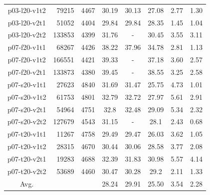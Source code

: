 \begin{table}[!h]
\begin {tabular}[!h]{|c|r|c|c|c|c|c|c|}
p03-l20-v1t2    & 79215 & 4467  & 30.19 & 30.13 &   27.08   & 2.77  & 1.30  \\
p03-l20-v2t1    & 51052 & 4404  & 29.84 & 29.84 &   28.35   & 1.45  & 1.04  \\
p03-l20-v2t2    & 133853 & 4399 & 31.76 & \mbox{-}  &   30.45   & 3.55  & 3.11  \\\hline
p07-f20-v1t1    & 68267 & 4426  & 38.22 & 37.96 &   34.78   & 2.81  & 1.13  \\
p07-f20-v1t2    & 166551 & 4421 & 39.33 & \mbox{-}  &   37.18   & 3.60  & 2.57  \\
p07-f20-v2t1    & 133873 & 4380 & 39.45 & \mbox{-}  &   38.55   & 3.25  & 2.58  \\\hline
p07-s20-v1t1    & 27623 & 4840  & 31.69 & 31.47 &   25.75   & 4.73  & 1.01  \\
p07-s20-v1t2    & 61753 & 4801  & 32.79 & 32.72 &   27.97   & 5.61  & 2.91  \\
p07-s20-v2t1    & 54964 & 4751  & 32.8  & 32.48 &   29.09   & 5.34  & 2.32  \\
p07-s20-v2t2    & 127679 & 4543 & 31.15 & \mbox{-}  &   28.1    & 2.43  & 0.68  \\\hline
p07-t20-v1t1    & 11267 & 4758  & 29.49 & 29.47 &   26.03   & 3.62  & 1.05  \\
p07-t20-v1t2    & 28315 & 4670  & 30.44 & 30.06 &   28.58   & 3.77  & 2.08  \\
p07-t20-v2t1    & 19283 & 4688  & 32.39 & 31.83 &   30.98   & 5.57  & 4.14  \\
p07-t20-v2t2    & 53689 & 4460  & 30.47 & 30.28 &   29.2    & 2.11  & 1.33  \\\hline
Avg. &  &  & 28.24   & 29.91 &  25.50  &  3.54 &   2.28   \\\hline
\end{tabular}
\end{table}

